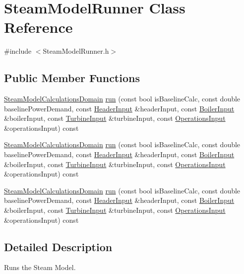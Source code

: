 \hypertarget{class_steam_model_runner}{}\section{Steam\+Model\+Runner Class Reference}
\label{class_steam_model_runner}


{\ttfamily \#include $<$Steam\+Model\+Runner.\+h$>$}

\subsection*{Public Member Functions}
\begin{DoxyCompactItemize}
\item 
\hyperlink{class_steam_model_calculations_domain}{Steam\+Model\+Calculations\+Domain} \hyperlink{class_steam_model_runner_a5f64eb443a97375a8c113babc081f017}{run} (const bool is\+Baseline\+Calc, const double baseline\+Power\+Demand, const \hyperlink{class_header_input}{Header\+Input} \&header\+Input, const \hyperlink{class_boiler_input}{Boiler\+Input} \&boiler\+Input, const \hyperlink{class_turbine_input}{Turbine\+Input} \&turbine\+Input, const \hyperlink{class_operations_input}{Operations\+Input} \&operations\+Input) const
\item 
\hyperlink{class_steam_model_calculations_domain}{Steam\+Model\+Calculations\+Domain} \hyperlink{class_steam_model_runner_a5f64eb443a97375a8c113babc081f017}{run} (const bool is\+Baseline\+Calc, const double baseline\+Power\+Demand, const \hyperlink{class_header_input}{Header\+Input} \&header\+Input, const \hyperlink{class_boiler_input}{Boiler\+Input} \&boiler\+Input, const \hyperlink{class_turbine_input}{Turbine\+Input} \&turbine\+Input, const \hyperlink{class_operations_input}{Operations\+Input} \&operations\+Input) const
\item 
\hyperlink{class_steam_model_calculations_domain}{Steam\+Model\+Calculations\+Domain} \hyperlink{class_steam_model_runner_a5f64eb443a97375a8c113babc081f017}{run} (const bool is\+Baseline\+Calc, const double baseline\+Power\+Demand, const \hyperlink{class_header_input}{Header\+Input} \&header\+Input, const \hyperlink{class_boiler_input}{Boiler\+Input} \&boiler\+Input, const \hyperlink{class_turbine_input}{Turbine\+Input} \&turbine\+Input, const \hyperlink{class_operations_input}{Operations\+Input} \&operations\+Input) const
\end{DoxyCompactItemize}


\subsection{Detailed Description}
Runs the Steam Model. 

